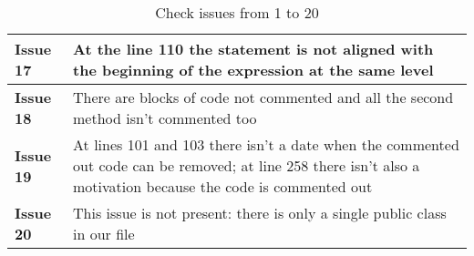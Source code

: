 \begin{table}[htbp]
\begin{center}
\begin{tabular}{l|p{}}
\hline
\textbf{Issue 17} & At the line 110 the statement is not aligned with the beginning of the expression at the same level \\
\hline
\textbf{Issue 18} & There are blocks of code not commented and all the second method isn't commented too\\
\hline
\textbf{Issue 19} & At lines 101 and 103 there isn't a date when the commented out code can be removed; at line 258 there isn't also a motivation because the code is commented out\\
\hline
\textbf{Issue 20} & This issue is not present: there is only a single public class in our file\\
\hline
\end{tabular}
\caption{Check issues from 1 to 20}
\end{center}
\end{table}

